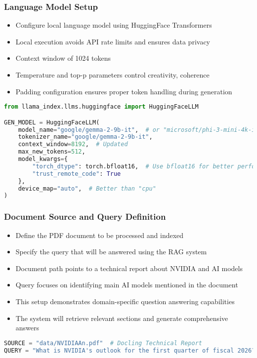 \begin{frame}[fragile]\frametitle{Language Model Setup}
      \begin{itemize}
          \item Configure local language model using HuggingFace Transformers
          \item Local execution avoids API rate limits and ensures data privacy
          \item Context window of 1024 tokens 
          \item Temperature and top-p parameters control creativity, coherence
          \item Padding configuration ensures proper token handling during generation
      \end{itemize}
      
\begin{lstlisting}[language=Python, basicstyle=\tiny]
from llama_index.llms.huggingface import HuggingFaceLLM

GEN_MODEL = HuggingFaceLLM(
    model_name="google/gemma-2-9b-it",  # or "microsoft/phi-3-mini-4k-instruct"
    tokenizer_name="google/gemma-2-9b-it",
    context_window=8192,  # Updated
    max_new_tokens=512,
    model_kwargs={
        "torch_dtype": torch.bfloat16,  # Use bfloat16 for better performance on modern GPUs
        "trust_remote_code": True
    },
    device_map="auto",  # Better than "cpu"
)
\end{lstlisting}
\end{frame}

\begin{frame}[fragile]\frametitle{Document Source and Query Definition}
      \begin{itemize}
          \item Define the PDF document to be processed and indexed
          \item Specify the query that will be answered using the RAG system
          \item Document path points to a technical report about NVIDIA and AI models
          \item Query focuses on identifying main AI models mentioned in the document
          \item This setup demonstrates domain-specific question answering capabilities
          \item The system will retrieve relevant sections and generate comprehensive answers
      \end{itemize}
      
\begin{lstlisting}[language=Python, basicstyle=\tiny]
SOURCE = "data/NVIDIAAn.pdf"  # Docling Technical Report
QUERY = "What is NVIDIA's outlook for the first quarter of fiscal 2026?"
\end{lstlisting}
\end{frame}


